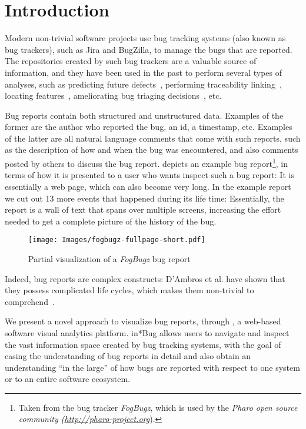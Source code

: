 \IEEEpeerreviewmaketitle



\section{Introduction}

Modern non-trivial software projects use bug tracking systems (also known as bug trackers), such as Jira and BugZilla, to manage the bugs that are reported. The repositories created by such bug trackers are a valuable source of information, and they have been used in the past to perform several types of analyses, such as predicting future defects~\cite{DAmb2012a}, performing traceability linking~\cite{Biss2013a}, locating features~\cite{Dit2013a}, ameliorating bug triaging decisions~\cite{Anvi2006a}, etc.

Bug reports contain both structured and unstructured data. Examples of the former are the author who reported the bug, an id, a timestamp, etc. Examples of the latter are all natural language comments that come with such reports, such as the description of how and when the bug was encountered, and also comments posted by others to discuss the bug report.  depicts an example bug report\footnote{Taken from the bug tracker \textit{FogBugz}, which is used by the \textit{Pharo open source community (\url{http://pharo-project.org}}).}, in terms of how it is presented to a user who wants inspect such a bug report: It is essentially a web page, which can also become very long. In the example report we cut out 13 more events that happened during its life time: Essentially, the report is a wall of text that spans over multiple screens, increasing the effort needed to get a complete picture of the history of the bug.

\begin{figure}[ht]
\center
\texttt{[image: Images/fogbugz-fullpage-short.pdf]}
\caption{Partial visualization of a \textit{FogBugz} bug report}
\label{fig-fogbugz-massive}
\end{figure}

Indeed, bug reports are complex constructs: D'Ambros et al. have shown that they possess complicated life cycles, which makes them non-trivial to comprehend~\cite{DAmb2007a}.

We present a novel approach to visualize bug reports, through \ib, a web-based software visual analytics platform. in*Bug allows users to navigate and inspect the vast information space created by bug tracking systems, with the goal of easing the understanding of bug reports in detail and also obtain an understanding ``in the large'' of how bugs are reported with respect to one system or to an entire software ecosystem.


